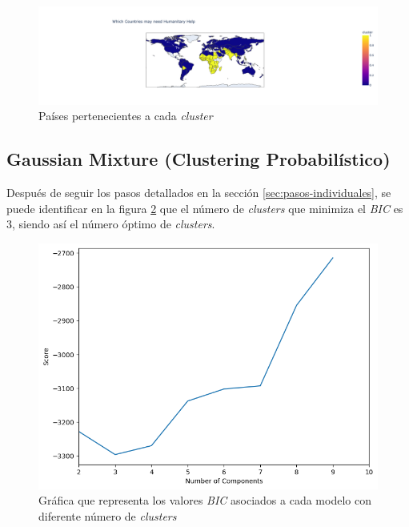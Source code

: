 \documentclass{article}
\begin{document}
\begin{figure}[H]
  \centering
  \includegraphics[width=\linewidth]{../images/agglomerative/map.png}
  \caption{Países pertenecientes a cada \textit{cluster}}
  \label{fig:agglomerative-map}
\end{figure}

\subsection{Gaussian Mixture (Clustering Probabilístico)}
\noindent Después de seguir los pasos detallados en la sección \ref{sec:pasos-individuales}, se puede identificar en la figura \ref{fig:bic} que el número de \textit{clusters} que minimiza el \textit{BIC} es 3,
siendo así el número óptimo de \textit{clusters}.

\begin{figure}[H]
  \centering
  \includegraphics[width=0.35\linewidth]{../images/gaussian/bic.png}
  \caption{Gráfica que representa los valores \textit{BIC} asociados a cada modelo con diferente número de \textit{clusters}}
  \label{fig:bic}
\end{figure}
\end{document}
